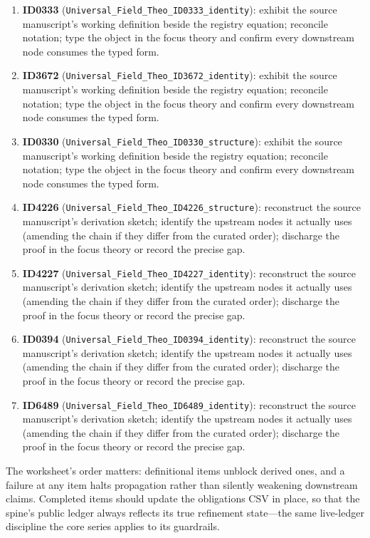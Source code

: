 \documentclass[11pt]{article}
\theoremstyle{remark}
\begin{document}
\begin{enumerate}
\item \textbf{ID0333} (\texttt{Universal\_Field\_Theo\_ID0333\_identity}): exhibit the source manuscript's working definition beside the registry equation; reconcile notation; type the object in the focus theory and confirm every downstream node consumes the typed form.
\item \textbf{ID3672} (\texttt{Universal\_Field\_Theo\_ID3672\_identity}): exhibit the source manuscript's working definition beside the registry equation; reconcile notation; type the object in the focus theory and confirm every downstream node consumes the typed form.
\item \textbf{ID0330} (\texttt{Universal\_Field\_Theo\_ID0330\_structure}): exhibit the source manuscript's working definition beside the registry equation; reconcile notation; type the object in the focus theory and confirm every downstream node consumes the typed form.
\item \textbf{ID4226} (\texttt{Universal\_Field\_Theo\_ID4226\_structure}): reconstruct the source manuscript's derivation sketch; identify the upstream nodes it actually uses (amending the chain if they differ from the curated order); discharge the proof in the focus theory or record the precise gap.
\item \textbf{ID4227} (\texttt{Universal\_Field\_Theo\_ID4227\_identity}): reconstruct the source manuscript's derivation sketch; identify the upstream nodes it actually uses (amending the chain if they differ from the curated order); discharge the proof in the focus theory or record the precise gap.
\item \textbf{ID0394} (\texttt{Universal\_Field\_Theo\_ID0394\_identity}): reconstruct the source manuscript's derivation sketch; identify the upstream nodes it actually uses (amending the chain if they differ from the curated order); discharge the proof in the focus theory or record the precise gap.
\item \textbf{ID6489} (\texttt{Universal\_Field\_Theo\_ID6489\_identity}): reconstruct the source manuscript's derivation sketch; identify the upstream nodes it actually uses (amending the chain if they differ from the curated order); discharge the proof in the focus theory or record the precise gap.
\end{enumerate}

The worksheet's order matters: definitional items unblock derived ones, and a failure at any item halts propagation rather than silently weakening downstream claims. Completed items should update the obligations CSV in place, so that the spine's public ledger always reflects its true refinement state---the same live-ledger discipline the core series applies to its guardrails.
\end{document}
